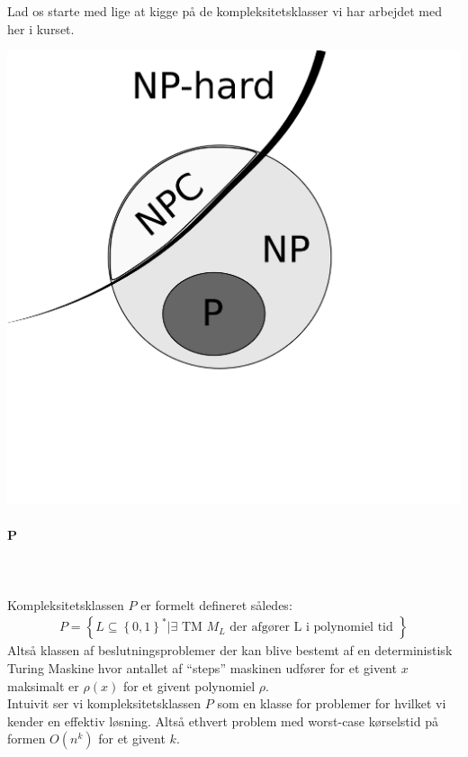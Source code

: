 Lad os starte med lige at kigge på de kompleksitetsklasser vi har arbejdet med her i kurset.
\begin{center}
 \includegraphics[bb=0 0 400 400,scale=0.3]{img/PNPNPC.png}
\end{center}


\paragraph{P}
~\\
~\\
Kompleksitetsklassen $P$ er formelt defineret således:
\begin{align*}
 P = \left\lbrace L \subseteq \left\lbrace 0,1 \right\rbrace^* | \exists \text{ TM } M_L \text{ der afgører L i polynomiel tid } \right\rbrace
\end{align*}
Altså klassen af beslutningsproblemer der kan blive bestemt af en deterministisk Turing Maskine hvor antallet af ``steps'' maskinen udfører for et givent $x$ maksimalt er $\rho(x)$ for et givent polynomiel $\rho$.\\
 
Intuivit ser vi kompleksitetsklassen $P$ som en klasse for problemer for hvilket vi kender en effektiv løsning. Altså ethvert problem med worst-case kørselstid på formen $O(n^k)$ for et givent $k$.

